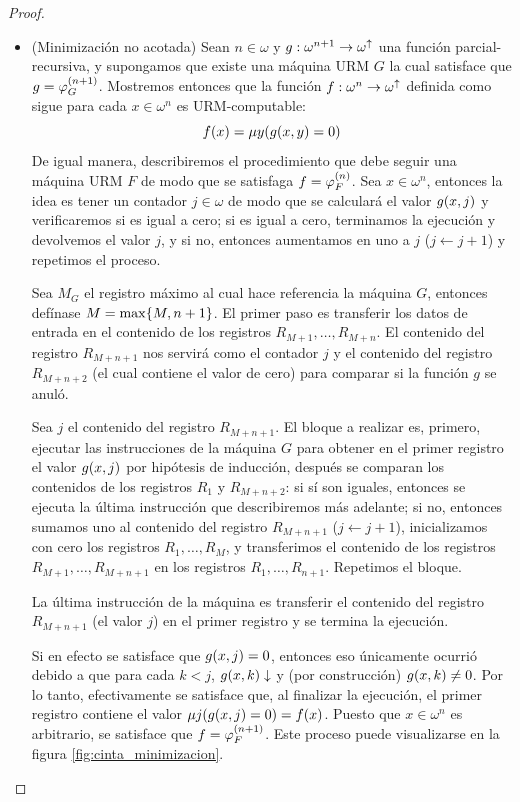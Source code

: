 \begin{proof}
\begin{itemize}
\begin{itemize}
			\item (Minimización no acotada) Sean $n\in\omega$ y $g:\omega^{n + 1}\to\omega^{\uparrow}$ una función parcial-recursiva, y supongamos que existe una máquina URM $G$ la cual satisface que $g =\PHI{G}[n + 1]$. Mostremos entonces que la función $f:\omega^{n}\to\omega^{\uparrow}$ definida como sigue para cada $x\in\omega^{n}$ es URM-computable:
	\[
		f\pa*{x} =\mu y\pa*{g\pa*{x, y} = 0}
	\]
	De igual manera, describiremos el procedimiento que debe seguir una máquina URM $F$ de modo que se satisfaga $f =\PHI{F}[n]$. Sea $x\in\omega^{n}$, entonces la idea es tener un contador $j\in\omega$ de modo que se calculará el valor $g\pa*{x, j}$ y verificaremos si es igual a cero; si es igual a cero, terminamos la ejecución y devolvemos el valor $j$, y si no, entonces aumentamos en uno a $j$ ($j\leftarrow j + 1$) y repetimos el proceso.

	Sea $M_{G}$ el registro máximo al cual hace referencia la máquina $G$, entonces defínase $M =\max\set*{M, n + 1}$. El primer paso es transferir los datos de entrada en el contenido de los registros $R_{M + 1},\dotsc, R_{M + n}$. El contenido del registro $R_{M + n + 1}$ nos servirá como el contador $j$ y el contenido del registro $R_{M + n + 2}$ (el cual contiene el valor de cero) para comparar si la función $g$ se anuló.

	Sea $j$ el contenido del registro $R_{M + n + 1}$. El bloque a realizar es, primero, ejecutar las instrucciones de la máquina $G$ para obtener en el primer registro el valor $g\pa*{x, j}$ por hipótesis de inducción, después se comparan los contenidos de los registros $R_{1}$ y $R_{M + n + 2}$: si sí son iguales, entonces se ejecuta la última instrucción que describiremos más adelante; si no, entonces sumamos uno al contenido del registro $R_{M + n + 1}$ ($j\leftarrow j + 1$), inicializamos con cero los registros $R_{1},\dotsc, R_{M}$, y transferimos el contenido de los registros $R_{M + 1},\dotsc, R_{M + n + 1}$ en los registros $R_{1},\dotsc, R_{n + 1}$. Repetimos el bloque.

	La última instrucción de la máquina es transferir el contenido del registro $R_{M + n + 1}$ (el valor $j$) en el primer registro y se termina la ejecución.

	Si en efecto se satisface que $g\pa*{x, j} = 0$, entonces eso únicamente ocurrió debido a que para cada $k < j$, $g\pa*{x, k}\ACABA$ y (por construcción) $g\pa*{x, k}\neq 0$. Por lo tanto, efectivamente se satisface que, al finalizar la ejecución, el primer registro contiene el valor $\mu j\pa*{g\pa*{x, j} = 0} = f\pa*{x}$. Puesto que $x\in\omega^{n}$ es arbitrario, se satisface que $f =\PHI{F}[n + 1]$. Este proceso puede visualizarse en la figura \ref{fig:cinta_minimizacion}.


\end{itemize}
\end{itemize}
\end{proof}
